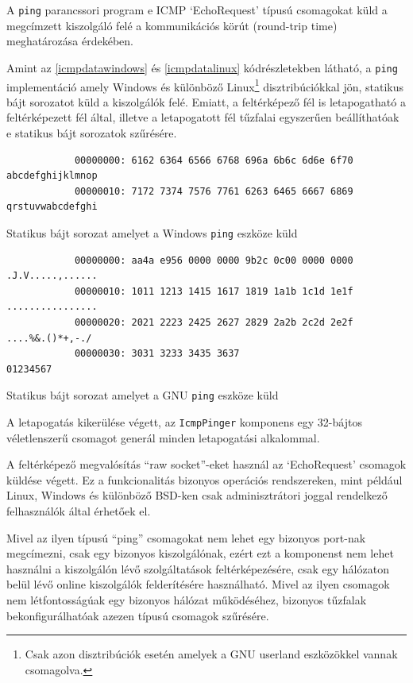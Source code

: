 \documentclass[a4paper,12pt]{article}
\begin{document}
	A \texttt{ping} parancssori program e ICMP `EchoRequest' típusú csomagokat küld a megcímzett kiszolgáló felé a kommunikációs körút (round-trip time) meghatározása érdekében.
	
	Amint az \ref{icmpdatawindows} és \ref{icmpdatalinux} kódrészletekben látható, a \texttt{ping} implementáció amely Windows és különböző Linux\footnote{Csak azon disztribúciók esetén amelyek a GNU userland eszközökkel vannak csomagolva.} disztribúciókkal jön, statikus bájt sorozatot küld a kiszolgálók felé. Emiatt, a feltérképező fél is letapogatható a feltérképezett fél által, illetve a letapogatott fél tűzfalai egyszerűen beállíthatóak e statikus bájt sorozatok szűrésére.
	
	\begin{listing}[H]
		\begin{verbatim}
			00000000: 6162 6364 6566 6768 696a 6b6c 6d6e 6f70  abcdefghijklmnop
			00000010: 7172 7374 7576 7761 6263 6465 6667 6869  qrstuvwabcdefghi
		\end{verbatim}
		\caption{Statikus bájt sorozat amelyet a Windows \texttt{ping} eszköze küld}
		\label{icmpdatawindows}
	\end{listing}
	
	\begin{listing}[H]
		\begin{verbatim}
			00000000: aa4a e956 0000 0000 9b2c 0c00 0000 0000  .J.V.....,......
			00000010: 1011 1213 1415 1617 1819 1a1b 1c1d 1e1f  ................
			00000020: 2021 2223 2425 2627 2829 2a2b 2c2d 2e2f   ....%&.()*+,-./
			00000030: 3031 3233 3435 3637                      01234567
		\end{verbatim}
		\caption{Statikus bájt sorozat amelyet a GNU \texttt{ping} eszköze küld}
		\label{icmpdatalinux}
	\end{listing}
	
	A letapogatás kikerülése végett, az \texttt{IcmpPinger} komponens egy 32-bájtos véletlenszerű csomagot generál minden letapogatási alkalommal.
	
	A feltérképező megvalósítás ``raw socket''-eket használ az `EchoRequest' csomagok küldése végett. Ez a funkcionalitás bizonyos operációs rendszereken, mint például Linux, Windows és különböző BSD-ken csak adminisztrátori joggal rendelkező felhasználók által érhetőek el.

	Mivel az ilyen típusú ``ping'' csomagokat nem lehet egy bizonyos port-nak megcímezni, csak egy bizonyos kiszolgálónak, ezért ezt a komponenst nem lehet használni a kiszolgálón lévő szolgáltatások feltérképezésére, csak egy hálózaton belül lévő online kiszolgálók felderítésére használható. Mivel az ilyen csomagok nem létfontosságúak egy bizonyos hálózat működéséhez, bizonyos tűzfalak bekonfigurálhatóak azezen típusú csomagok szűrésére.
\end{document}
